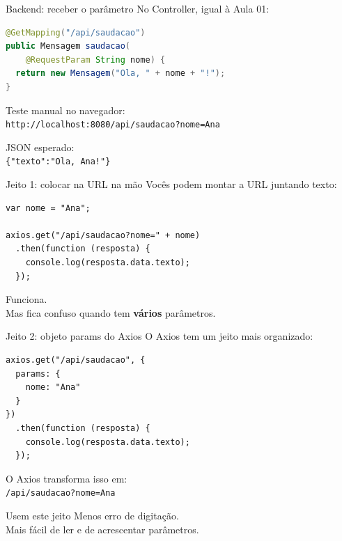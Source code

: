 \documentclass[aspectratio=169,11pt]{beamer}
\begin{document}
\begin{frame}[fragile]{Backend: receber o parâmetro}
  No Controller, igual à Aula 01:

\begin{lstlisting}[language=Java,basicstyle=\ttfamily\footnotesize]
@GetMapping("/api/saudacao")
public Mensagem saudacao(
    @RequestParam String nome) {
  return new Mensagem("Ola, " + nome + "!");
}
\end{lstlisting}

  \vspace{0.4em}
  Teste manual no navegador:\\
  \texttt{http://localhost:8080/api/saudacao?nome=Ana}

  \vspace{0.3em}
  JSON esperado:\\
  \texttt{\{"texto":"Ola, Ana!"\}}
\end{frame}

\begin{frame}[fragile]{Jeito 1: colocar na URL na mão}
  Vocês podem montar a URL juntando texto:

\begin{lstlisting}[basicstyle=\ttfamily\footnotesize]
var nome = "Ana";

axios.get("/api/saudacao?nome=" + nome)
  .then(function (resposta) {
    console.log(resposta.data.texto);
  });
\end{lstlisting}

  \vspace{0.5em}
  Funciona.\\
  Mas fica confuso quando tem \textbf{vários} parâmetros.
\end{frame}

\begin{frame}[fragile]{Jeito 2: objeto params do Axios}
  O Axios tem um jeito mais organizado:

\begin{lstlisting}[basicstyle=\ttfamily\footnotesize]
axios.get("/api/saudacao", {
  params: {
    nome: "Ana"
  }
})
  .then(function (resposta) {
    console.log(resposta.data.texto);
  });
\end{lstlisting}

  \vspace{0.4em}
  O Axios transforma isso em:\\
  \texttt{/api/saudacao?nome=Ana}

  \vspace{0.4em}
  \begin{alertblock}{Usem este jeito}
    Menos erro de digitação.\\
    Mais fácil de ler e de acrescentar parâmetros.
  \end{alertblock}
\end{frame}
\end{document}
